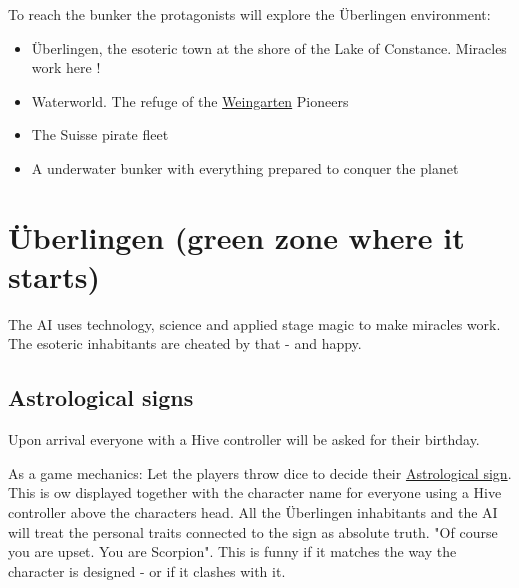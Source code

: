 To reach the bunker the protagonists will explore the Überlingen environment:
\begin{itemize}
    \item {Überlingen, the esoteric town at the shore of the Lake of Constance. Miracles work here !}
    \item {Waterworld. The refuge of the \hyperref[subsec:Weingarten]{Weingarten} Pioneers}
    \item {The Suisse pirate fleet}
    \item {A underwater bunker with everything prepared to conquer the planet}
\end{itemize}


\section{Überlingen (green zone where it starts)}

The AI uses technology, science and applied stage magic to make miracles work. The esoteric inhabitants are cheated by that - and happy.

\subsection{Astrological signs}

Upon arrival everyone with a Hive controller will be asked for their birthday.

As a game mechanics: Let the players throw dice to decide their \href{https://en.wikipedia.org/wiki/Astrological_sign}{Astrological sign}. This is ow displayed together with the character name for everyone using a Hive controller above the characters head.
All the Überlingen inhabitants and the AI will treat the personal traits connected to the sign as absolute truth. "Of course you are upset. You are Scorpion". This is funny if it matches the way the character is designed - or if it clashes with it.

